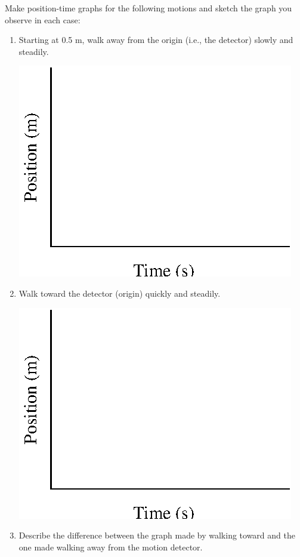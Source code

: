 Make position-time graphs for the following motions and sketch the graph you
observe in each case:

\begin{enumerate}

\item Starting at 0.5 m, walk away from the origin (i.e., the detector) slowly
and steadily.

\vspace{0.3cm}
{\par\centering \includegraphics{iqsRelatingMotion/position_fig1.eps} \par}
\vspace{0.3cm}

\item Walk toward the detector (origin) quickly and steadily.

\vspace{0.3cm}
{\par\centering \includegraphics{iqsRelatingMotion/position_fig1.eps} \par}
\vspace{0.3cm}

\item Describe the difference between the graph made by walking toward and the
one made walking away from the motion detector.
\vspace{20mm}

\end{enumerate}

